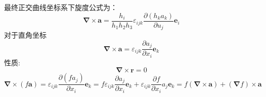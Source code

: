 最终正交曲线坐标系下旋度公式为：
\begin{equation}
    \boldsymbol{\nabla} \times \boldsymbol a
= 
\frac{h_i}{h_1h_2h_3}\varepsilon_{ijk}\frac{\partial (h_ka_k)}{\partial u_j}\boldsymbol{e}_i\label{正交曲线坐标系下旋度公式}
\end{equation}
对于直角坐标
\begin{equation}
    \boldsymbol{\nabla} \times \boldsymbol a
= 
\varepsilon_{ijk}\frac{\partial a_j}{\partial x_i}\boldsymbol{e}_k
\end{equation}
性质:
\begin{equation}
    \boldsymbol{\nabla}\times\boldsymbol{r}=0
\end{equation}
\begin{equation}
    \boldsymbol{\nabla}\times (f\boldsymbol{a})=\varepsilon_{ijk}\frac{\partial (fa_j)}{\partial x_i}\boldsymbol{e}_k=f\varepsilon_{ijk}\frac{\partial a_j}{\partial x_i}\boldsymbol{e}_k+\varepsilon_{ijk}\frac{\partial f}{\partial x_i}a_j\boldsymbol{e}_k=f(\boldsymbol{\nabla}\times \boldsymbol{a})+(\boldsymbol{\nabla} f)\times \boldsymbol{a}\label{向量恒等式1}
\end{equation}

